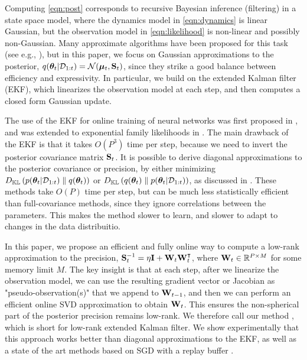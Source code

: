 Computing \cref{eqn:post}
corresponds to recursive Bayesian inference (filtering)
in a state space model,
where the
dynamics model
in \cref{eqn:dynamics}
is linear Gaussian,
but the observation model
in \cref{eqn:likelihood}
is
non-linear and possibly non-Gaussian.
Many approximate algorithms have been proposed
for this task (see e.g.,  \citep{Sarkka23,pml2Book}),
but in this paper, we focus on Gaussian approximations
to the posterior, $q({\bm{\theta}}_t|{\mathcal{D}}_{1:t}) =\mathcal{N}(\boldsymbol{\mu}_t,\mathbf{S}_t)$,
since they strike a good balance between 
efficiency and expressivity.
In particular, we build on the extended
Kalman filter (EKF), which linearizes the observation model at each step, and then computes a closed form Gaussian update.

The use of the EKF for online training of neural networks
was first proposed in \citep{Singhal1988},
and was extended to exponential family likelihoods
in \citep{Ollivier2018,Tronarp2018}.
The main drawback of the EKF is that it takes $O(P^3)$ time per step,
because we need to invert the posterior covariance matrix $\mathbf{S}_t$.
It is possible to derive diagonal approximations to the posterior covariance or precision,
by either minimizing 
$D_{\mathbb{KL}}\left({p({\bm{\theta}}_t|{\mathcal{D}}_{1:t})} \mathrel{\|} {q({\bm{\theta}}_t)}\right)$
or
$D_{\mathbb{KL}}\left({q({\bm{\theta}}_t)} \mathrel{\|} {p({\bm{\theta}}_t|{\mathcal{D}}_{1:t})}\right)$,
as discussed in \citep{Puskorius1991,Chang2022}.
These methods take $O(P)$ time per step,
but can be much less statistically efficient
than full-covariance methods, since they ignore
correlations between the parameters.
This makes the method slower to learn,
and slower to adapt to changes in the data distribuitio.

In this paper, we propose an efficient and fully online way to compute a low-rank approximation to the precision, $\mathbf{S}_t^{-1} = \eta\mathbf{I} + \mathbf{W}_t\mathbf{W}_t^\intercal$, where $\mathbf{W}_t\in\mathbb{R}^{P\times M}$ for some memory limit $M$.
The key insight is that at each step, after we linearize the observation model, we can use the resulting gradient vector or Jacobian as "pseudo-observation(s)" that we append to $\mathbf{W}_{t-1}$, and then we can perform an efficient online SVD approximation to obtain $\mathbf{W}_t$.
This ensures the non-spherical part of the posterior precision remains low-rank.
We therefore call our method \lofi,
which is short for low-rank extended Kalman filter.
We show experimentally that this approach works better than diagonal approximations to the EKF,
as well as a state of the art methods
based on  SGD  with a replay buffer
 \citep{Cai2021}.


    











